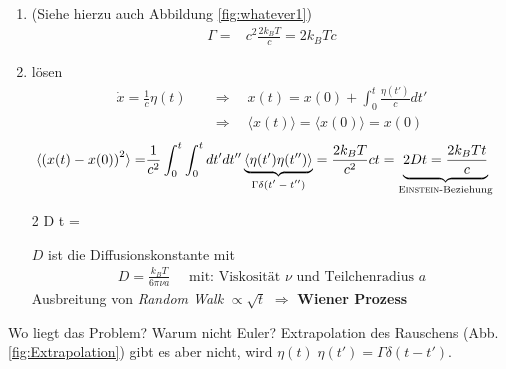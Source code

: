 \documentclass[12pt]{article}
\begin{document}
\begin{enumerate} 
\item (Siehe hierzu auch Abbildung \ref{fig:whatever1})
\begin{align}
\Gamma =& c^2 \frac{2 k_B T}{c} = 2 k_B T c
\end{align}
\item lösen \begin{align*}
\dot{x}= \frac{1}{c} \eta (t) \quad &\Rightarrow \quad x(t) = x(0) + \int_0^t \frac{\eta (t')}{c} dt'  \\
& \Rightarrow \quad \langle x(t) \rangle = \langle x(0) \rangle = x(0) 
\end{align*}
\begin{align*}
\langle \left(x(t) - x(0) \right)^2 \rangle =& \frac{1}{c^2} \int_0^t \int_0^t dt' dt'' \underbrace{\langle \eta (t') \eta (t'') \rangle}_\text{$ \Gamma \delta (t' - t'')$} = \frac{2 k_B T}{c^2} c t = \underbrace{2 D t = \frac{2 k_B T t}{c}}_\text{\textsc{Einstein}-Beziehung}
\end{align*}
\begin{tcolorbox}[ams align, title= Einstein-Beziehung , colback=blue!10!white, colframe=blue!30!black] 
2 D t = 
\end{tcolorbox}
$D$ ist die Diffusionskonstante mit \begin{align*}
D= \frac{k_B T}{6 \pi \nu a} \quad \mbox{ mit: Viskosität } \nu \mbox{ und Teilchenradius } a
\end{align*}
Ausbreitung von \textit{Random Walk} $\propto \sqrt{t}$ $\Rightarrow$ \textbf{Wiener Prozess}  \\ 
\end{enumerate}
Wo liegt das Problem? Warum nicht Euler?
Extrapolation des Rauschens (Abb. \ref{fig:Extrapolation}) gibt es aber nicht, wird $\eta (t) \; \eta(t') = \Gamma \delta (t-t')$. \\
\end{document}
